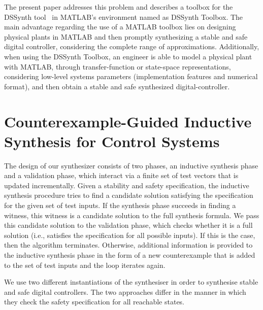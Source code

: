 \documentclass[10pt,conference]{IEEEtran}
\newcommand\tool{{DSSynth Toolbox}\xspace}
\begin{document}
The present paper addresses this problem and describes a toolbox for the DSSynth tool~\cite{abate2017, abatecav2017} 
in MATLAB's environment named as \tool. The main advantage regarding the use of a MATLAB toolbox 
lies on designing physical plants in MATLAB and then promptly synthesizing a stable and safe digital controller,
considering the complete range of approximations. 
Additionally, when using the \tool, an engineer is able to model a physical plant with MATLAB, 
through transfer-function or state-space representations, considering low-level systems parameters 
(implementation features and numerical format), and then obtain a stable and safe synthesized digital-controller.

\section{Counterexample-Guided Inductive Synthesis for Control Systems}



The design of our synthesizer consists of two phases, an inductive
synthesis phase and a validation phase, which interact via a finite
set of test vectors that is updated incrementally.  Given a stability
and safety specification, the inductive synthesis procedure tries to
find a candidate solution satisfying the specification for the given set of test inputs.
%
If the synthesis phase succeeds in finding a witness, this witness is
a candidate solution to the full synthesis formula.  We pass this
candidate solution to the validation phase, which checks whether it is
a full solution (i.e., satisfies the specification for all possible
inputs).  If this is the case, then the algorithm terminates.
Otherwise, additional information is provided to the inductive
synthesis phase in the form of a new counterexample that is added to
the set of test inputs and the loop iterates again.

We use two different instantiations of the synthesiser
in order to synthesise stable and safe digital
controllers. The two approaches differ in
the manner in which they check the safety specification
for all reachable states.
\end{document}
